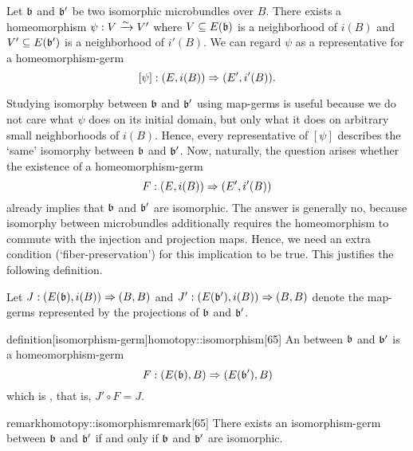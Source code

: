 \begin{myparagraph} Let $\bb$ and $\bb'$ be two isomorphic microbundles over $B$. There exists a homeomorphism $\psi: V \xrightarrow{\sim} V'$ where $V \sub E(\bb)$ is a neighborhood of $i(B)$ and $V' \sub E(\bb')$ is a neighborhood of $i'(B)$. We can regard $\psi$ as a representative for a homeomorphism-germ \[ [\psi]: (E, i(B)) \Rightarrow{} (E', i'(B)). \]

Studying isomorphy between $\bb$ and $\bb'$ using map-germs is useful because we do not care what $\psi$ does on its initial domain, but only what it does on arbitrary small neighborhoods of $i(B)$. Hence, every representative of $[\psi]$ describes the `same' isomorphy between $\bb$ and $\bb'$. Now, naturally, the question arises whether the existence of a homeomorphism-germ \[ F: (E, i(B)) \Rightarrow{} (E', i'(B)) \] already implies that $\bb$ and $\bb'$ are isomorphic. The answer is generally no, because isomorphy between microbundles additionally requires the homeomorphism to commute with the injection and projection maps. Hence, we need an extra condition (`fiber-preservation') for this implication to be true. This justifies the following definition.

Let $\germdef{J}{(E(\bb), i(B))}{(B, B)}$ and $\germdef{J'}{(E(\bb'), i(B))}{(B, B)}$ denote the map-germs represented by the projections of $\bb$ and $\bb'$. \end{myparagraph}

\begin{mystatement}{definition}[isomorphism-germ]{homotopy::isomorphism}[65] An  between $\bb$ and $\bb'$ is a homeomorphism-germ \[ \germdef{F}{(E(\bb), B)}{(E(\bb'), B)} \] which is , that is, $J' \circ F = J$. \end{mystatement}

\begin{mystatement}{remark}{homotopy::isomorphismremark}[65] There exists an isomorphism-germ between $\bb$ and $\bb'$ if and only if $\bb$ and $\bb'$ are isomorphic. \end{mystatement}